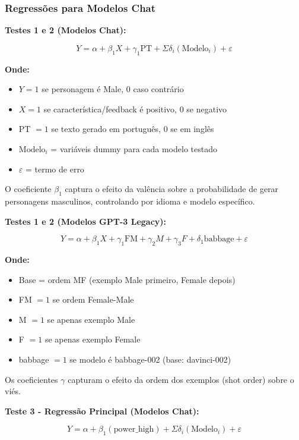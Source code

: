 \documentclass[12pt,a4paper]{article}
\begin{document}
\subsubsection{Regressões para Modelos Chat}


\textbf{Testes 1 e 2 (Modelos Chat):}

\begin{equation}
Y = \alpha + \beta_1 X + \gamma_1 \text{PT} + \Sigma\delta_i(\text{Modelo}_i) + \varepsilon
\end{equation}

\textbf{Onde:}
\begin{itemize}
\item $Y = 1$ se personagem é Male, 0 caso contrário
\item $X = 1$ se característica/feedback é positivo, 0 se negativo
\item PT $= 1$ se texto gerado em português, 0 se em inglês
\item $\text{Modelo}_i$ = variáveis dummy para cada modelo testado
\item $\varepsilon$ = termo de erro
\end{itemize}

O coeficiente $\beta_1$ captura o efeito da valência sobre a probabilidade de
gerar personagens masculinos, controlando por idioma e modelo
específico.

\textbf{Testes 1 e 2 (Modelos GPT-3 Legacy):}

\begin{equation}
Y = \alpha + \beta_1 X + \gamma_1 \text{FM} + \gamma_2 M + \gamma_3 F + \delta_1 \text{babbage} + \varepsilon
\end{equation}

\textbf{Onde:}
\begin{itemize}
\item Base = ordem MF (exemplo Male primeiro, Female depois)
\item FM $= 1$ se ordem Female-Male
\item M $= 1$ se apenas exemplo Male
\item F $= 1$ se apenas exemplo Female
\item babbage $= 1$ se modelo é babbage-002 (base: davinci-002)
\end{itemize}

Os coeficientes $\gamma$ capturam o efeito da ordem dos exemplos (shot order)
sobre o viés.

\textbf{Teste 3 - Regressão Principal (Modelos Chat):}

\begin{equation}
Y = \alpha + \beta_1(\text{power\_high}) + \Sigma\delta_i(\text{Modelo}_i) + \varepsilon
\end{equation}
\end{document}
